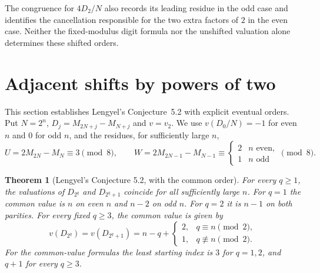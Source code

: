 \documentclass[11pt,a4paper]{article}
\newtheorem{theorem}{Theorem}[section]
\begin{document}
\noindent
The congruence for $4D_2/N$ also records its leading residue in the
odd case and identifies the cancellation responsible for the two
extra factors of $2$ in the even case. Neither the fixed-modulus
digit formula nor the unshifted valuation alone determines these
shifted orders.
\section{Adjacent shifts by powers of two}\label{sec:paired}
This section establishes Lengyel's Conjecture~5.2 with explicit eventual orders. Put $N=2^n$, $D_j=M_{2N+j}-M_{N+j}$ and $v=v_2$. We use $v(D_0/N)=-1$ for even $n$ and $0$ for odd $n$, and the residues, for sufficiently large $n$,
\[
 U=2M_{2N}-M_N\equiv3\pmod8,\qquad
 W=2M_{2N-1}-M_{N-1}\equiv
 \begin{cases}2&n\text{ even},\\1&n\text{ odd}\end{cases}\pmod8 .
\]
\begin{theorem}[Lengyel's Conjecture 5.2, with the common order]
For every $q\ge1$, the valuations of $D_{2^q}$ and $D_{2^q+1}$ coincide for all sufficiently large $n$. For $q=1$ the common value is $n$ on even $n$ and $n-2$ on odd $n$. For $q=2$ it is $n-1$ on both parities. For every fixed $q\ge3$, the common value is given by
\[
v(D_{2^q})=v(D_{2^q+1})=n-q+
\begin{cases}2,&q\equiv n\pmod 2,\\1,&q\not\equiv n\pmod2 .\end{cases}
\]
For the common-value formulas the least starting index is $3$ for
$q=1,2$, and $q+1$ for every $q\ge3$.

\end{theorem}
\end{document}
